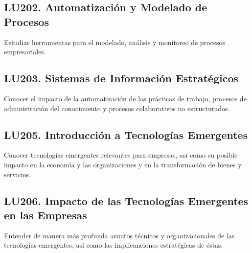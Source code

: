 \subsection{LU202. Automatización y Modelado de Procesos}\label{sec:BOK-LU202}\label{sec:LU202}
\begin{LearningUnit}
\begin{LUGoal}
\item Estudiar herramientas para el modelado, análisis y monitoreo de procesos empresariales.
\end{LUGoal}

\end{LearningUnit}

\subsection{LU203. Sistemas de Información Estratégicos}\label{sec:BOK-LU203}\label{sec:LU203}
\begin{LearningUnit}
\begin{LUGoal}
\item Conocer el impacto de la automatización de las prácticas de trabajo, procesos de administración del conocimiento y procesos colaborativos no estructurados.
\end{LUGoal}

\end{LearningUnit}

\subsection{LU205. Introducción a Tecnologías Emergentes}\label{sec:BOK-LU205}\label{sec:LU205}
\begin{LearningUnit}
\begin{LUGoal}
\item Conocer tecnologías emergentes relevantes para empresas, así como su posible impacto en la economía y las organizaciones y en la transformación de bienes y servicios.
\end{LUGoal}

\end{LearningUnit}

\subsection{LU206. Impacto de las Tecnologías Emergentes en las Empresas}\label{sec:BOK-LU206}\label{sec:LU206}
\begin{LearningUnit}
\begin{LUGoal}
\item Entender de manera más profunda asuntos técnicos y organizacionales de las tecnologías emergentes, así como las implicanciones estratégicas de éstas.
\end{LUGoal}

\end{LearningUnit}

